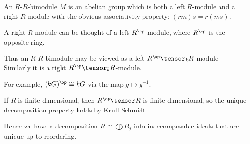 An $R$-$R$-bimodule $M$ is an abelian group which is both a left $R$-module and
a right $R$-module with the obvious associativity property: $(rm)s = r(ms)$.

A right $R$-module can be thought of a left $R^\op$-module, where $R^\op$ is
the opposite ring.

Thus an $R$-$R$-bimodule may be viewed as a left $R^\op\tensor_k R$-module.
Similarly it is a right $R^\op\tensor_k R$-module.

For example, $(kG)^\op\cong kG$ via the map $g\mapsto g^{-1}$.

If $R$ is finite-dimensional, then $R^\op\tensor R$ is finite-dimensional, so the
unique decomposition property holds by Krull-Schmidt.

Hence we have a decomposition  $R\cong \bigoplus B_j$ into indecomposable ideals
that are unique up to reordering.

